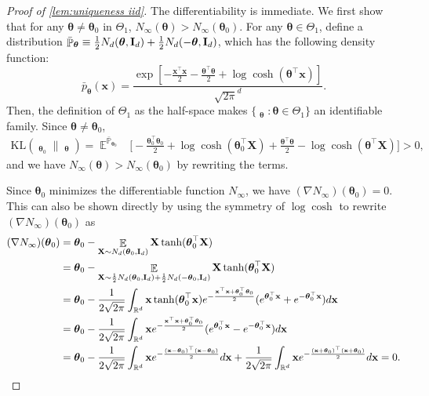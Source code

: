 \documentclass[preprint,reqno]{imsart}
\newcommand{\ttheta}{\boldsymbol{\theta}}
\newcommand{\I}{\mathbf{I}_{\mathnormal{d}}}
\DeclareMathOperator{\EE}{\mathbb{E}}
\DeclareMathOperator{\PP}{\mathbb{P}}
\DeclareMathOperator{\PPB}{\bar{\mathbb{P}}}
\newcommand{\x}{\mathbf{x}}
\newcommand{\X}{\mathbf{X}}
\begin{document}
\begin{proof}[Proof of \cref{lem:uniqueness iid}]
    The differentiability is immediate. We first show that for any $\ttheta\neq \ttheta_0$ in $\Theta_1$, $N_{\infty}(\ttheta) > N_{\infty} (\ttheta_0)$.
    For any $\ttheta \in \Theta_1$, define a distribution $\bar{\PP}_{\ttheta} \equiv \frac{1}{2} N_d(\ttheta, \I) + \frac{1}{2} N_d(-\ttheta, \I)$, which has the following density function: $$\bar{p}_{\ttheta}(\x) = \frac{\exp \left[ - \frac{\x^{\top} \x}{2} - \frac{\ttheta^\top \ttheta}{2} + \log \cosh(\ttheta^{\top} \x) \right]}{\sqrt{2\pi}^d}.$$
    Then, the definition of $\Theta_1$ as the half-space makes $\{\PPB_{\ttheta}: \ttheta\in \Theta_1 \}$ an identifiable family. Since $\ttheta\neq \ttheta_0$,
    \begin{align*}
        \text{KL}(\PPB_{\ttheta_0} \| \PPB_{\ttheta}) = \EE^{\bar{\PP}_{\ttheta_0}} &\Big[ - \frac{\ttheta_0^\top \ttheta_0}{2} + \log \cosh(\ttheta_0^{\top} \X) +  \frac{\ttheta^\top \ttheta}{2} - \log \cosh(\ttheta^{\top} \X)\Big] > 0,
    \end{align*}
    and we have
    $N_{\infty}(\ttheta) > N_{\infty}(\ttheta_0)$ by rewriting the terms.

    Since $\ttheta_0$ minimizes the differentiable function $N_{\infty}$, we have $(\nabla N_{\infty})(\ttheta_0) = 0$. {This can also be shown directly by using the symmetry of $\log \cosh$ to rewrite $(\nabla N_{\infty}) (\ttheta_0)$ as
    \begin{align*}
        (\nabla N_{\infty})(\ttheta_0) &= \ttheta_0 - \EE_{\X \sim N_d(\ttheta_0, \I)} \X \tanh (\ttheta_0^\top \X) \\
        &= \ttheta_0 - \EE_{\X \sim \frac{1}{2} N_d(\ttheta_0, \I) + \frac{1}{2} N_d(-\ttheta_0, \I)} \X \tanh(\ttheta_0^\top \X)\\
        &= \ttheta_0 - \frac{1}{2 \sqrt{2 \pi}} \int_{\mathbb{R}^d} \x \tanh(\ttheta_0^\top \x)  e^{- \frac{\x^\top \x + \ttheta_0^\top \ttheta_0}{2}} (e^{\ttheta_0^\top \x} + e^{-\ttheta_0^\top \x}) d \x \\
        &= \ttheta_0 - \frac{1}{2 \sqrt{2 \pi}} \int_{\mathbb{R}^d} \x e^{- \frac{\x^\top \x + \ttheta_0^\top \ttheta_0}{2}} (e^{\ttheta_0^\top \x} - e^{-\ttheta_0^\top \x}) d\x \\
        &= \ttheta_0 - \frac{1}{2 \sqrt{2 \pi}} \int_{\mathbb{R}^d} \x e^{- \frac{(\x - \ttheta_0)^\top (\x - \ttheta_0)}{2}} d\x + \frac{1}{2 \sqrt{2 \pi}} \int_{\mathbb{R}^d} \x e^{-\frac{(\x+\ttheta_0)^\top (\x+\ttheta_0)}{2}} d\x = 0.
    \end{align*}
    }
    

\end{proof}
\end{document}
